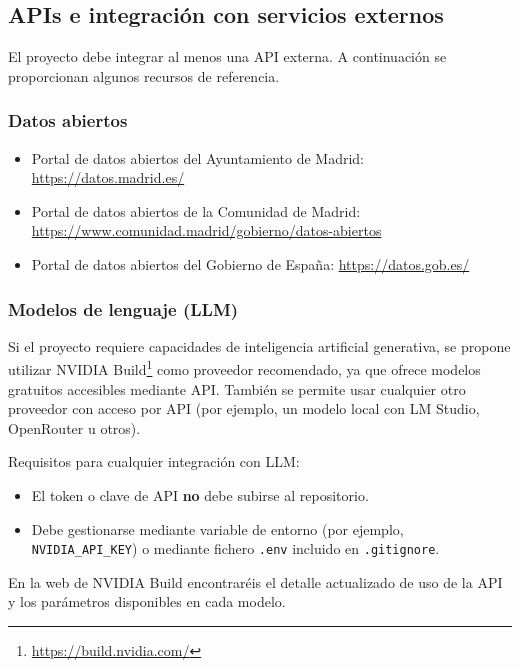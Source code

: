 \subsection{APIs e integración con servicios externos}
\label{sec:practica-2026-05-ltaw:apis}

El proyecto debe integrar al menos una API externa. A continuación se proporcionan algunos recursos de referencia.

\subsubsection*{Datos abiertos}

\begin{itemize}
  \item Portal de datos abiertos del Ayuntamiento de Madrid: \url{https://datos.madrid.es/}
  \item Portal de datos abiertos de la Comunidad de Madrid: \url{https://www.comunidad.madrid/gobierno/datos-abiertos}
  \item Portal de datos abiertos del Gobierno de España: \url{https://datos.gob.es/}
\end{itemize}

\subsubsection*{Modelos de lenguaje (LLM)}

Si el proyecto requiere capacidades de inteligencia artificial generativa, se propone utilizar NVIDIA Build\footnote{\url{https://build.nvidia.com/}} como proveedor recomendado, ya que ofrece modelos gratuitos accesibles mediante API. También se permite usar cualquier otro proveedor con acceso por API (por ejemplo, un modelo local con LM Studio, OpenRouter u otros).

Requisitos para cualquier integración con LLM:

\begin{itemize}
  \item El token o clave de API \textbf{no} debe subirse al repositorio.
  \item Debe gestionarse mediante variable de entorno (por ejemplo, \verb|NVIDIA_API_KEY|) o mediante fichero \verb|.env| incluido en \verb|.gitignore|.
\end{itemize}

En la web de NVIDIA Build encontraréis el detalle actualizado de uso de la API y los parámetros disponibles en cada modelo.

